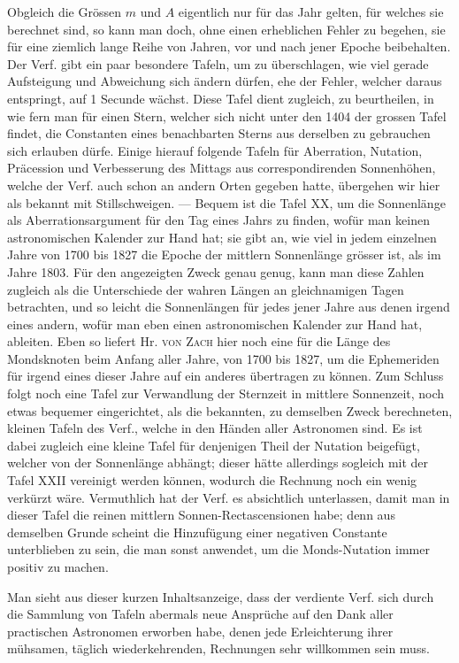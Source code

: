 Obgleich die Grössen $m$ und $A$ eigentlich nur für das Jahr gelten, für welches sie berechnet sind, so kann man doch, ohne einen erheblichen Fehler zu begehen, sie für eine ziemlich lange Reihe von Jahren, vor und nach jener Epoche beibehalten. Der Verf. gibt ein paar besondere Tafeln, um zu überschlagen, wie viel gerade Aufsteigung und Abweichung sich ändern dürfen, ehe der Fehler, welcher daraus entspringt, auf 1 Secunde wächst. Diese Tafel dient zugleich, zu beurtheilen, in wie fern man für einen Stern, welcher sich nicht unter den 1404 der grossen Tafel findet, die Constanten eines benachbarten Sterns aus derselben zu gebrauchen sich erlauben dürfe. Einige hierauf folgende Tafeln für Aberration, Nutation, Präcession und Verbesserung des Mittags aus correspondirenden Sonnenhöhen, welche der Verf. auch schon an andern Orten gegeben hatte, übergehen wir hier als bekannt mit Stillschweigen. --- Bequem ist die Tafel XX, um die Sonnenlänge als Aberrationsargument für den Tag eines Jahrs zu finden, wofür man keinen astronomischen Kalender zur Hand hat; sie gibt an, wie viel in jedem einzelnen Jahre von 1700 bis 1827 die Epoche der mittlern Sonnenlänge grösser ist, als im Jahre 1803. Für den angezeigten Zweck genau genug, kann man diese Zahlen zugleich als die Unterschiede der wahren Längen an gleichnamigen Tagen betrachten, und so leicht die Sonnenlängen für jedes jener Jahre aus denen irgend eines andern, wofür man eben einen astronomischen Kalender zur Hand hat, ableiten. Eben so liefert Hr. \textsc{von Zach} hier noch eine für die Länge des Mondsknoten beim Anfang aller Jahre, von 1700 bis 1827, um die Ephemeriden für irgend eines dieser Jahre auf ein anderes übertragen zu können. Zum Schluss folgt noch eine Tafel zur Verwandlung der Sternzeit in mittlere Sonnenzeit, noch etwas bequemer eingerichtet, als die bekannten, zu demselben Zweck berechneten, kleinen Tafeln des Verf., welche in den Händen aller Astronomen sind. Es ist dabei zugleich eine kleine Tafel für denjenigen Theil der Nutation beigefügt, welcher von der Sonnenlänge abhängt; dieser hätte allerdings sogleich mit der Tafel XXII vereinigt werden können, wodurch die Rechnung noch ein wenig verkürzt wäre. Vermuthlich hat der Verf. es absichtlich unterlassen, damit man in dieser Tafel die reinen mittlern Sonnen-Rectascensionen habe; denn aus demselben Grunde scheint die Hinzufügung einer negativen Constante unterblieben zu sein, die man sonst anwendet, um die Monds-Nutation immer positiv zu machen.

Man sieht aus dieser kurzen Inhaltsanzeige, dass der verdiente Verf. sich durch die Sammlung von Tafeln abermals neue Ansprüche auf den Dank aller practischen Astronomen erworben habe, denen jede Erleichterung ihrer mühsamen, täglich wiederkehrenden, Rechnungen sehr willkommen sein muss.
